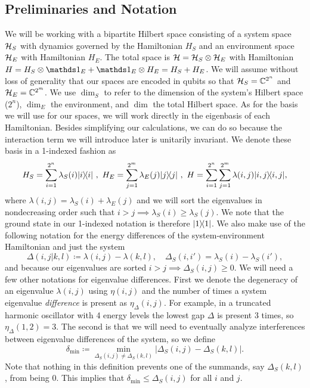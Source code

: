 \subsection{Preliminaries and Notation} \label{sec:prelim}
We will be working with a bipartite Hilbert space consisting of a system space $\mathcal{H}_S$ with dynamics governed by the Hamiltonian $H_S$ and an environment space $\mathcal{H}_E$ with Hamiltonian $H_E$. The total space is $\mathcal{H} = \mathcal{H}_S \otimes \mathcal{H}_E$ with Hamiltonian $H = H_S \otimes \identity_E + \identity_E \otimes H_E = H_S + H_E$. We will assume without loss of generality that our spaces are encoded in qubits so that $\mathcal{H}_S = \mathbb{C}^{2^n}$ and $\mathcal{H}_E = \mathbb{C}^{2^m}$. We use $\dim_S$ to refer to the dimension of the system's Hilbert space ($2^n$), $\dim_E$ the environment, and $\dim$ the total Hilbert space. As for the basis we will use for our spaces, we will work directly in the eigenbasis of each Hamiltonian. Besides simplifying our calculations, we can do so because the interaction term we will introduce later is unitarily invariant. We denote these basis in a 1-indexed fashion as
\begin{equation}
    H_{S} = \sum_{i = 1}^{2^n} \lambda_S(i) | i\rangle\! \langle i| ~,~ H_{E} = \sum_{j=1}^{2^m } \lambda_E(j) | j\rangle\! \langle j| ~,~ H = \sum_{i=1}^{2^n } \sum_{j=1}^{2^m } \lambda(i,j) | i,j\rangle\! \langle i,j|,
\end{equation}
where $\lambda(i,j) = \lambda_S(i) + \lambda_E(j)$ and we will sort the eigenvalues in nondecreasing order such that $i > j \implies \lambda_S(i) \geq \lambda_S(j)$. We note that the ground state in our 1-indexed notation is therefore $| 1\rangle\! \langle 1|$. We also make use of the following notation for the energy differences of the system-environment Hamiltonian and just the system
\begin{equation}
\Delta(i,j|k,l) \coloneqq \lambda(i,j) - \lambda(k,l), \quad \Delta_S(i,i') = \lambda_S(i) - \lambda_S(i'), \label{eq:delta_def}
\end{equation}
and because our eigenvalues are sorted $i > j \implies \Delta_S(i,j) \geq 0$. We will need a few other notations for eigenvalue differences. First we denote the degeneracy of an eigenvalue $\lambda(i,j)$ using $\eta(i,j)$ and the number of times a system eigenvalue \emph{difference} is present as $\eta_\Delta(i,j)$. For example, in a truncated harmonic oscillator with 4 energy levels the lowest gap $\Delta$ is present 3 times, so $\eta_\Delta(1, 2) = 3$. The second is that we will need to eventually analyze interferences between eigenvalue differences of the system, so we define
\begin{equation}
    \delta_{\min} \coloneqq \min_{\Delta_S(i,j) \neq \Delta_S(k,l)} \left| \Delta_S(i,j) - \Delta_S(k, l) \right|. \label{eq:delta_min_def}
\end{equation}
Note that nothing in this definition prevents one of the summands, say $\Delta_S(k,l)$, from being 0. This implies that $\delta_{\min} \leq \Delta_S(i,j)$ for all $i$ and $j$.

